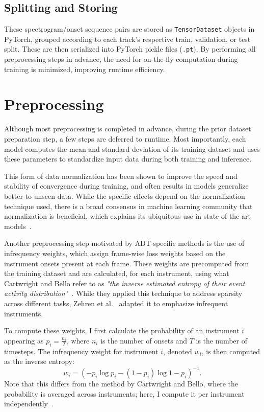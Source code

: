 \subsection{Splitting and Storing}

These spectrogram/onset sequence pairs are stored as \texttt{TensorDataset} objects in PyTorch, grouped according to each track's respective train, validation, or test split. These are then serialized into PyTorch pickle files (\texttt{.pt}). By performing all preprocessing steps in advance, the need for on-the-fly computation during training is minimized, improving runtime efficiency.

\section{Preprocessing}

Although most preprocessing is completed in advance, during the prior dataset preparation step, a few steps are deferred to runtime. Most importantly, each model computes the mean and standard deviation of its training dataset and uses these parameters to standardize input data during both training and inference. 

This form of data normalization has been shown to improve the speed and stability of convergence during training, and often results in models generalize better to unseen data. While the specific effects depend on the normalization technique used, there is a broad consensus in machine learning community that normalization is beneficial, which explains its ubiquitous use in state-of-the-art models~\cite{10056354}.

Another preprocessing step motivated by \gls{ADT}-specific methods is the use of infrequency weights, which assign frame-wise loss weights based on the instrument onsets present at each frame. These weights are precomputed from the training dataset and are calculated, for each instrument, using what Cartwright and Bello refer to as \textit{"the inverse estimated entropy of their event activity distribution"}~\cite{cartwright2018increasing}. While they applied this technique to address sparsity across different tasks, Zehren et al.~\cite{signals4040042} adapted it to emphasize infrequent instruments.

To compute these weights, I first calculate the probability of an instrument $i$ appearing as $p_i = \frac{n_i}{T}$, where $n_i$ is the number of onsets and $T$ is the number of timesteps. The infrequency weight for instrument $i$, denoted $w_i$, is then computed as the inverse entropy: \[w_i = \left(-p_i\log p_i - (1 - p_i)\log{1 - p_i}\right)^{-1}.\] Note that this differs from the method by Cartwright and Bello, where the probability is averaged across instruments; here, I compute it per instrument independently~\cite{cartwright2018increasing}. 

